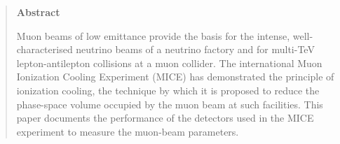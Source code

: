 \begin{quotation}
\begin{center}
\textbf{Abstract}
\end{center}

\noindent
Muon beams of low emittance provide the basis for the intense,
well-characterised neutrino beams of a neutrino factory and for
multi-TeV lepton-antilepton collisions at a muon collider.
The international Muon Ionization Cooling Experiment (MICE) has
demonstrated the principle of ionization cooling, the technique by
which it is proposed to reduce the phase-space volume occupied by the
muon beam at such facilities. 
This paper documents the performance of the detectors used in the MICE
experiment to measure the muon-beam parameters.

\end{quotation}
